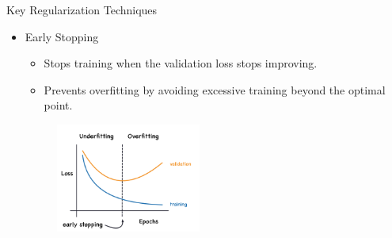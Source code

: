 \documentclass[serif, aspectratio=169]{beamer}
\begin{document}
\begin{frame}{Key Regularization Techniques}
    \begin{itemize}

            \item Early Stopping
            \begin{itemize}
                \item Stops training when the validation loss stops improving.
                \item Prevents overfitting by avoiding excessive training beyond the optimal point.
            \end{itemize}

            \begin{figure}
                \includegraphics[width=0.45\textwidth]{pic/Early-Stopping.png}
                \label{fig:Early-Stopping}
            \end{figure}
            
    \end{itemize}
\end{frame}
\end{document}

